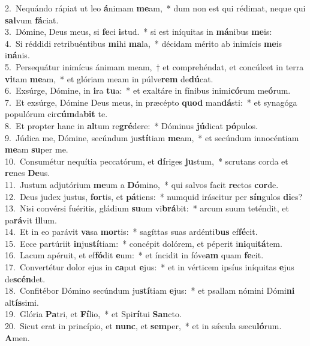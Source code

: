 {2.~}Nequándo rápiat ut leo \textbf{á}nimam \textbf{me}am,~* dum non est qui rédimat, neque qui \textbf{sal}vum \textbf{fá}ciat.\\
{3.~}Dómine, Deus meus, si \textbf{fe}ci \textbf{i}stud.~* si est iníquitas in \textbf{má}nibus \textbf{me}is:\\
{4.~}Si réddidi retribuéntibus \textbf{mi}hi \textbf{ma}la,~* décidam mérito ab inimícis \textbf{me}is i\textbf{ná}nis.\\
{5.~}Persequátur inimícus ánimam meam,~† et comprehéndat, et concúlcet in terra \textbf{vi}tam \textbf{me}am,~* et glóriam meam in púlve\textbf{rem} de\textbf{dú}cat.\\
{6.~}Exsúrge, Dómine, in \textbf{i}ra \textbf{tu}a:~* et exaltáre in fínibus inimi\textbf{có}rum me\textbf{ó}rum.\\
{7.~}Et exsúrge, Dómine Deus meus, in præcépto \textbf{quod} man\textbf{dá}sti:~* et synagóga populórum cir\textbf{cúm}da\textbf{bit} te.\\
{8.~}Et propter hanc in \textbf{al}tum re\textbf{gré}dere:~* Dóminus \textbf{jú}dicat \textbf{pó}pulos.\\
{9.~}Júdica me, Dómine, secúndum ju\textbf{stí}tiam \textbf{me}am,~* et secúndum innocéntiam \textbf{me}am \textbf{su}per me.\\
{10.~}Consumétur nequítia peccatórum, et \textbf{dí}riges \textbf{ju}stum,~* scrutans corda et \textbf{re}nes \textbf{De}us.\\
{11.~}Justum adjutórium \textbf{me}um a \textbf{Dó}mino,~* qui salvos facit \textbf{re}ctos \textbf{cor}de.\\
{12.~}Deus judex justus, \textbf{for}tis, et \textbf{pá}tiens:~* numquid iráscitur per \textbf{sín}gulos \textbf{di}es?\\
{13.~}Nisi convérsi fuéritis, gládium \textbf{su}um vi\textbf{brá}bit:~* arcum suum teténdit, et pa\textbf{rá}vit \textbf{il}lum.\\
{14.~}Et in eo parávit \textbf{va}sa \textbf{mor}tis:~* sagíttas suas ardénti\textbf{bus} ef\textbf{fé}cit.\\
{15.~}Ecce partúriit \textbf{in}ju\textbf{stí}tiam:~* concépit dolórem, et péperit i\textbf{ni}qui\textbf{tá}tem.\\
{16.~}Lacum apéruit, et ef\textbf{fó}dit \textbf{e}um:~* et íncidit in fóve\textbf{am} quam \textbf{fe}cit.\\
{17.~}Convertétur dolor ejus in \textbf{ca}put \textbf{e}jus:~* et in vérticem ipsíus iníquitas \textbf{e}jus de\textbf{scén}det.\\
{18.~}Confitébor Dómino secúndum ju\textbf{stí}tiam \textbf{e}jus:~* et psallam nómini Dómi\textbf{ni} al\textbf{tís}simi.\\
{19.~}Glória \textbf{Pa}tri, et \textbf{Fí}lio,~* et Spi\textbf{rí}tui \textbf{San}cto.\\
{20.~}Sicut erat in princípio, et \textbf{nunc}, et \textbf{sem}per,~* et in sǽcula sæcu\textbf{ló}rum. \textbf{A}men.\\
